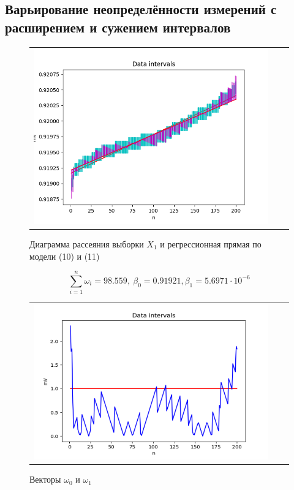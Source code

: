 \documentclass[a4paper,14pt]{article}
\begin{document}
	\subsection{Варьирование неопределённости измерений с расширением и сужением интервалов}
	\begin{figure}[H]
		\begin{center}
			\begin{tabular}{ccc}
				\includegraphics[scale=0.7]{../image/data_and_intervals3.png}
			\end{tabular}
		\end{center}
		\caption{Диаграмма рассеяния выборки $X_1$ и регрессионная прямая по модели (10) и (11)} 
	\end{figure}

	\begin{equation*}
		\sum\limits_{i=1}^n \omega_i = 98.559 ,\ \beta_0 = 0.91921, \beta_1 = 5.6971 \cdot 10^{-6}
	\end{equation*}

	\begin{figure}[H]
		\begin{center}
			\begin{tabular}{ccc}
				\includegraphics[scale=0.8]{../image/data4.png}
			\end{tabular}
		\end{center}
		\caption{Векторы $\omega_0$ и $\omega_1$} 
	\end{figure}
	
\end{document}

